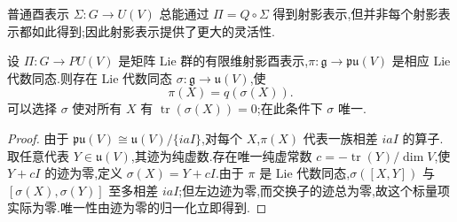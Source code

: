 {普通酉表示 $\Sigma:G\to U(V)$ 总能通过 $\Pi=Q\circ\Sigma$ 得到射影表示,但并非每个射影表示都如此得到;因此射影表示提供了更大的灵活性.

\begin{proposition}\label{prop:projective-representation-lie-lift}
设 $\Pi:G\to PU(V)$ 是矩阵 Lie 群的有限维射影酉表示,$\pi:\mathfrak g\to\mathfrak{pu}(V)$ 是相应 Lie 代数同态.则存在 Lie 代数同态 $\sigma:\mathfrak g\to\mathfrak u(V)$,使
\[
\pi(X)=q(\sigma(X)).
\]
可以选择 $\sigma$ 使对所有 $X$ 有 $\operatorname{tr}(\sigma(X))=0$;在此条件下 $\sigma$ 唯一.
\end{proposition}

\begin{proof}
由于 $\mathfrak{pu}(V)\cong\mathfrak u(V)/\{iaI\}$,对每个 $X$,$\pi(X)$ 代表一族相差 $iaI$ 的算子.取任意代表 $Y\in\mathfrak u(V)$,其迹为纯虚数.存在唯一纯虚常数 $c=-\operatorname{tr}(Y)/\dim V$,使 $Y+cI$ 的迹为零,定义 $\sigma(X)=Y+cI$.由于 $\pi$ 是 Lie 代数同态,$\sigma([X,Y])$ 与 $[\sigma(X),\sigma(Y)]$ 至多相差 $iaI$;但左边迹为零,而交换子的迹总为零,故这个标量项实际为零.唯一性由迹为零的归一化立即得到.
\end{proof}

}

